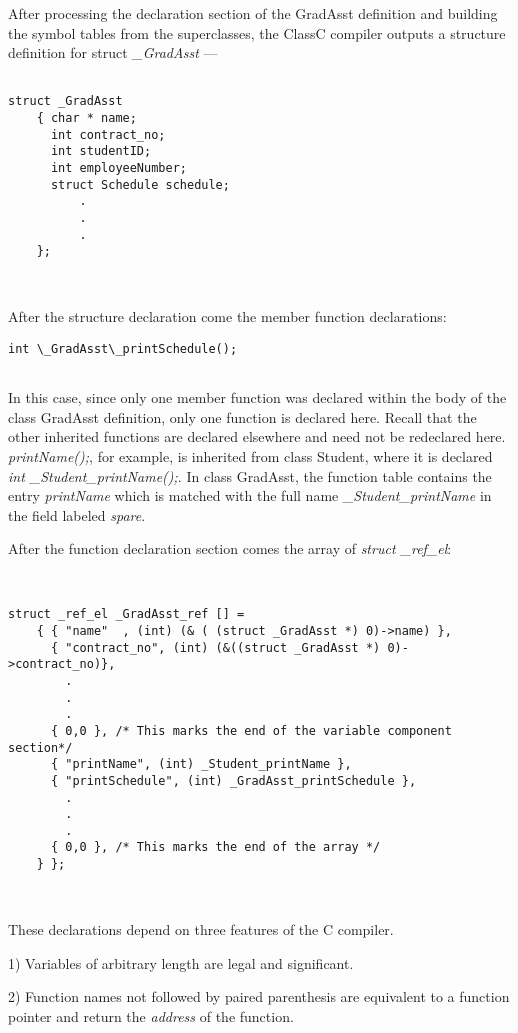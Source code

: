 After processing the declaration section of the GradAsst definition and
building the symbol tables from the superclasses, the ClassC compiler
outputs a structure definition for struct {\em \_GradAsst} ---

\begin{verbatim}

struct _GradAsst
	{ char * name;
	  int contract_no;
	  int studentID;
	  int employeeNumber;
	  struct Schedule schedule;
          .
          .
          .
	};



\end{verbatim}

After the structure declaration come the member function declarations:
\begin{verbatim}
int \_GradAsst\_printSchedule();


\end{verbatim}
In this case, since only one member function was declared within the body
of the class GradAsst definition, only one function is declared here.
Recall that the other inherited functions are
declared elsewhere and need not be redeclared here.
{\em printName();}, for example, is inherited from class Student, where it
is declared {\em int \_Student\_printName();}.  In class GradAsst, the
function table contains the entry {\em printName} which is matched with the
full name {\em \_Student\_printName} in the field labeled {\em spare}.

After the function declaration section comes the array of
{\em struct \_ref\_el}:


\begin{verbatim}


struct _ref_el _GradAsst_ref [] =
    { { "name"	, (int) (& ( (struct _GradAsst *) 0)->name) },
      { "contract_no", (int) (&((struct _GradAsst *) 0)->contract_no)},
        .
        .
        .
      { 0,0 }, /* This marks the end of the variable component section*/
      { "printName", (int) _Student_printName },
      { "printSchedule", (int) _GradAsst_printSchedule },
        .
        .
        .
      { 0,0 }, /* This marks the end of the array */
    } };



\end{verbatim}

These declarations depend on three features of the
C compiler.

1) Variables of arbitrary length are legal
and significant.

2) Function names not followed by paired parenthesis
are equivalent to a function pointer and return the
{\em address} of the function.

